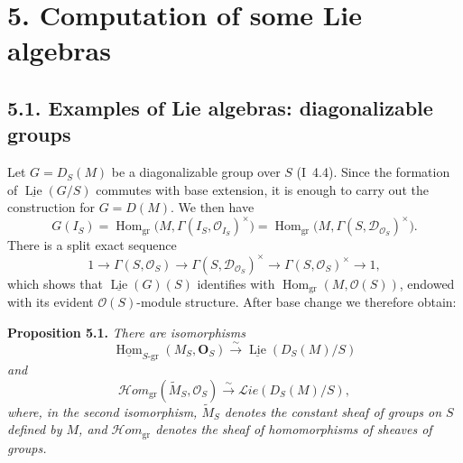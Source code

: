 
\section*{5. Computation of some Lie algebras}

\subsection*{5.1. Examples of Lie algebras: diagonalizable groups}

Let \(G=D_S(M)\) be a diagonalizable group over \(S\) (I~4.4). Since
the formation of \(\underline{\operatorname{Lie}}(G/S)\) commutes with
base extension, it is enough to carry out the construction for
\(G=D(M)\). We then have
\[
 G(I_S)=\operatorname{Hom}_{\mathrm{gr}}
   \bigl(M,\Gamma(I_S,\mathscr O_{I_S})^\times\bigr)
 =\operatorname{Hom}_{\mathrm{gr}}
   \bigl(M,\Gamma(S,\mathscr D_{\mathscr O_S})^\times\bigr).
\]
There is a split exact sequence
\[
 1\longrightarrow\Gamma(S,\mathscr O_S)
  \longrightarrow\Gamma(S,\mathscr D_{\mathscr O_S})^\times
  \longrightarrow\Gamma(S,\mathscr O_S)^\times
  \longrightarrow1,
\]
which shows that \(\underline{\operatorname{Lie}}(G)(S)\) identifies
with \(\operatorname{Hom}_{\mathrm{gr}}(M,\mathscr O(S))\), endowed
with its evident \(\mathscr O(S)\)-module structure. After base change
we therefore obtain:

\medskip
\noindent\textbf{Proposition 5.1.}
\textit{There are isomorphisms}
\[
 \underline{\operatorname{Hom}}_{S\text{-}\mathrm{gr}}
      (M_S,\mathbf O_S)
 \xrightarrow{\sim}
 \underline{\operatorname{Lie}}(D_S(M)/S)
\]
\textit{and}
\[
 \mathscr Hom_{\mathrm{gr}}(\widetilde M_S,\mathscr O_S)
 \xrightarrow{\sim}
 \mathscr Lie(D_S(M)/S),
\]
\textit{where, in the second isomorphism, \(\widetilde M_S\) denotes
the constant sheaf of groups on \(S\) defined by \(M\), and
\(\mathscr Hom_{\mathrm{gr}}\) denotes the sheaf of homomorphisms of
sheaves of groups.}

